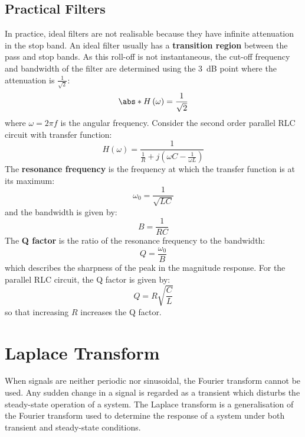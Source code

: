 \documentclass{article}
\begin{document}
\subsection{Practical Filters}
In practice, ideal filters are not realisable because they have
infinite attenuation in the stop band. An ideal filter usually has a
\textbf{transition region} between the pass and stop bands. As this
roll-off is not instantaneous, the cut-off frequency and bandwidth of
the filter are determined using the \qty{3}{dB} point where the
attenuation is \(\frac{1}{\sqrt{2}}\):
\begin{equation*}
    \abs*{H\left( \omega \right)} = \frac{1}{\sqrt{2}}
\end{equation*}
where \(\omega = 2\pi f\) is the angular frequency.
Consider the second order parallel RLC circuit with transfer function:
\begin{equation*}
    H\left( \omega \right) = \frac{1}{\frac{1}{R} + j \left( \omega C - \frac{1}{\omega L} \right)}
\end{equation*}
The \textbf{resonance frequency} is the frequency at which the transfer function is at its maximum:
\begin{equation*}
    \omega_0 = \frac{1}{\sqrt{LC}}
\end{equation*}
and the bandwidth is given by:
\begin{equation*}
    B = \frac{1}{RC}
\end{equation*}
The \textbf{Q factor} is the ratio of the resonance frequency to the bandwidth:
\begin{equation*}
    Q = \frac{\omega_0}{B}
\end{equation*}
which describes the sharpness of the peak in the magnitude response.
For the parallel RLC circuit, the Q factor is given by:
\begin{equation*}
    Q = R \sqrt{\frac{C}{L}}
\end{equation*}
so that increasing \(R\) increases the Q factor.
\section{Laplace Transform}
When signals are neither periodic nor sinusoidal, the Fourier transform
cannot be used. Any sudden change in a signal is regarded as a
transient which disturbs the steady-state operation of a system. The
Laplace transform is a generalisation of the Fourier transform used to
determine the response of a system under both transient and
steady-state conditions.
\end{document}

